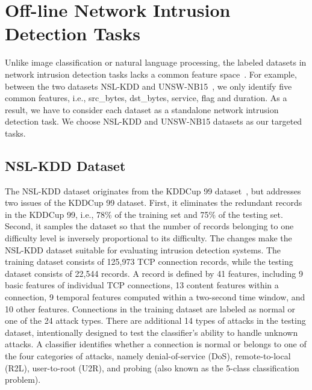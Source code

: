 \section{Off-line Network Intrusion Detection Tasks}
Unlike image classification or natural language processing,
the labeled datasets in network intrusion detection tasks lacks a common feature space~\cite{KDDCup, DARPA, UNSW, NSL-KDD}.
For example, between the two datasets NSL-KDD\cite{NSL-KDD} and UNSW-NB15~\cite{UNSW},
we only identify five common features, i.e., src\_bytes, dst\_bytes, service, flag and duration.
As a result, we have to consider each dataset as a standalone network intrusion detection task.
We choose NSL-KDD and UNSW-NB15 datasets as our targeted tasks.

\subsection{NSL-KDD Dataset}
The NSL-KDD dataset originates from the KDDCup 99 dataset~\cite{KDDCup},
but addresses two issues of the KDDCup 99 dataset.
First, it eliminates the redundant records in the KDDCup 99, i.e., 
78\% of the training set and 75\% of the testing set.
Second, it samples the dataset so that the number of records belonging to one difficulty level is inversely proportional to its difficulty.
The changes make the NSL-KDD dataset suitable for evaluating intrusion detection systems.
The training dataset consists of 125,973 TCP connection records, while the testing dataset consists of 22,544 records.
A record is defined by 41 features, including 9 basic features of individual TCP connections, 13 content features within a connection, 9 temporal features computed within a two-second time window, and 10 other features.
Connections in the training dataset are labeled as normal or one of the 24 attack types.
There are additional 14 types of attacks in the testing dataset, intentionally designed to test the classifier's ability to handle unknown attacks.
A classifier identifies whether a connection is normal or belongs to one of the four categories of attacks, namely denial-of-service (DoS), remote-to-local (R2L), user-to-root (U2R), and probing (also known as the 5-class classification problem).


